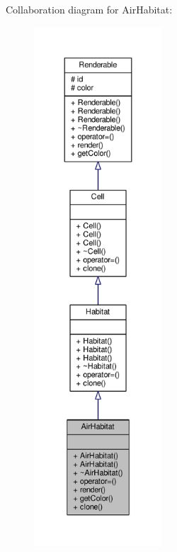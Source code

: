 Collaboration diagram for Air\+Habitat\+:
\nopagebreak
\begin{figure}[H]
\begin{center}
\leavevmode
\includegraphics[height=550pt]{classAirHabitat__coll__graph}
\end{center}
\end{figure}

